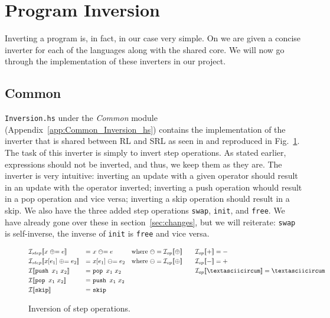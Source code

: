 \section{Program Inversion}

Inverting a program is, in fact, in our case very simple. On \cite[p.~104]{REV} we are given a concise inverter for each of the languages along with the shared core. We will now go through the implementation of these inverters in our project.

\subsection{Common}
\label{sec:invcommon}

\texttt{Inversion.hs} under the \textit{Common} module (Appendix~\ref{app:Common_Inversion_hs}) contains the implementation of the inverter that is shared between RL and SRL as seen in \cite[Fig.~20]{REV} and reproduced in Fig.~\ref{fig:inversion_common}. The task of this inverter is simply to invert step operations. As stated earlier, expressions should not be inverted, and thus, we keep them as they are. The inverter is very intuitive: inverting an update with a given operator should result in an update with the operator inverted; inverting a push operation whould result in a pop operation and vice versa; inverting a skip operation should result in a skip. We also have the three added step operations \texttt{swap}, \texttt{init}, and \texttt{free}. We have already gone over these in section~\ref{sec:changes}, but we will reiterate: \texttt{swap} is self-inverse, the inverse of \texttt{init} is \texttt{free} and vice versa.
\begin{figure}
  $$\begin{aligned}
    & \mathcal{I}_{step}\llbracket x \mathrel{\oplus}= e\rrbracket & =\ & x \mathrel{\ominus}= e & & \text{where }\ominus = \mathcal{I}_{op}\llbracket\oplus\rrbracket & \quad & \mathcal{I}_{op}\llbracket +\rrbracket = -\\
    & \mathcal{I}_{step}\llbracket x[e_1] \mathrel{\oplus}= e_2\rrbracket & =\ & x[e_1] \mathrel{\ominus}= e_2 & & \text{where }\ominus = \mathcal{I}_{op}\llbracket\oplus\rrbracket & \quad & \mathcal{I}_{op}\llbracket -\rrbracket = +\\
    & \mathcal{I}\llbracket\texttt{push }x_1\ x_2\rrbracket & =\ & \texttt{pop }x_1\ x_2 & & & \quad & \mathcal{I}_{op}\llbracket \mathrm{\textasciicircum}\rrbracket = \mathrm{\textasciicircum}\\
    & \mathcal{I}\llbracket\texttt{pop }x_1\ x_2\rrbracket & =\ & \texttt{push }x_1\ x_2\\
    & \mathcal{I}\llbracket\texttt{skip}\rrbracket & =\ & \texttt{skip}\\
  \end{aligned}$$
  \caption{Inversion of step operations.}
  \label{fig:inversion_common}
\end{figure}


